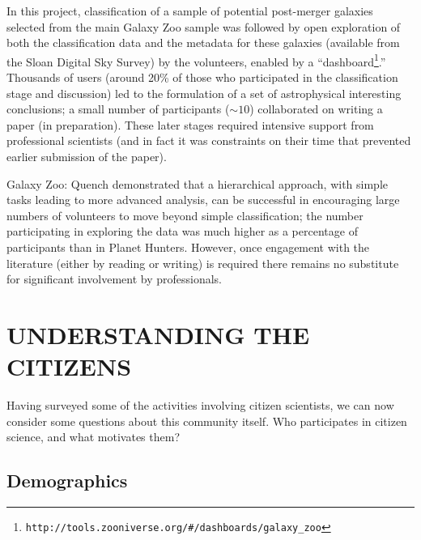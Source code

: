 \documentclass{ar2e}
\def\CaseStudy#1{\noindent{\it\bf #1 \,\,\,\,}}
\def\url#1{\texttt{#1}}
\begin{document}
In this project, classification of a sample of potential post-merger galaxies
selected from the main Galaxy Zoo sample was followed by open exploration of
both the classification data and the metadata for these galaxies (available from
the Sloan Digital Sky Survey) by the volunteers, enabled by a
``dashboard\footnote{\url{http://tools.zooniverse.org/\#/dashboards/galaxy\_zoo}}.''
Thousands of users (around 20\% of those who participated in the classification
stage and discussion) led to the formulation of a set of astrophysical
interesting conclusions; a small number of participants ($\sim10$) collaborated on
writing a paper (in preparation). These later stages required intensive support
from professional scientists (and in fact it was constraints on their time that
prevented earlier submission of the paper). 

Galaxy Zoo: Quench demonstrated that a hierarchical approach, with simple tasks leading to
more advanced analysis, can be successful in encouraging large numbers of
volunteers to move beyond simple classification; the number participating in
exploring the data was much higher as a percentage of participants than in
Planet Hunters. However, once engagement with the literature (either by reading
or writing) is required there remains no substitute for significant involvement
by professionals. 



% 




\section{UNDERSTANDING THE CITIZENS}
\label{sec:crowd}

Having surveyed some of the activities involving citizen scientists, we can
now consider some questions about this community itself. Who participates in
citizen science, and what motivates them?



\subsection{Demographics}
\label{sec:crowd:demographics}
\end{document}
